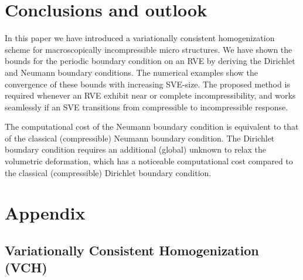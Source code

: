 \documentclass[12pt,a4paper]{article}
\begin{document}


\section{Conclusions and outlook}
In this paper we have introduced a variationally consistent homogenization scheme for macroscopically incompressible micro structures.
We have shown the bounds for the periodic boundary condition on an RVE by deriving the Dirichlet and Neumann boundary conditions. The numerical examples show the convergence of these bounds with increasing SVE-size.
The proposed method is required whenever an RVE exhibit near or complete incompressibility, and works seamlessly if an SVE transitions from compressible to incompressible response.


The computational cost of the Neumann boundary condition is equivalent to that of the classical (compressible) Neumann boundary condition.
The Dirichlet boundary condition requires an additional (global) unknown to relax the volumetric deformation, which has a noticeable computational cost compared to the classical (compressible) Dirichlet boundary condition.




%
%
%

%

\appendix
\setcounter{equation}{0}
\renewcommand{\theequation}{A-\arabic{equation}}

\section{Appendix}

\subsection{Variationally Consistent Homogenization (VCH)}
\label{appendix:1}
\end{document}
